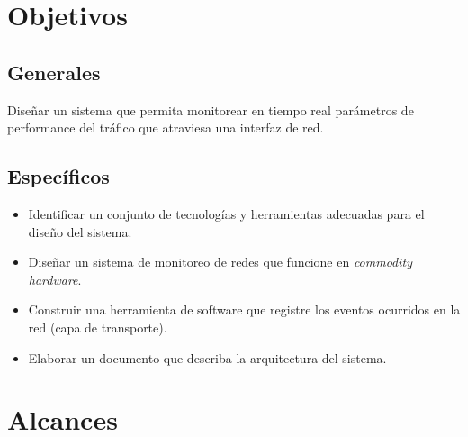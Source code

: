 \section*{Objetivos}
\subsection*{Generales}
Diseñar un sistema que permita monitorear en tiempo real parámetros de performance del tráfico que atraviesa una interfaz de red.
\subsection*{Específicos}
\begin{itemize}

\item Identificar un conjunto de tecnologías y herramientas adecuadas para el diseño del sistema.
\item Diseñar un sistema de monitoreo de redes que funcione en \textit{commodity hardware}.
\item Construir una herramienta de software que registre los eventos ocurridos en la red (capa de transporte).
\item Elaborar un documento que describa la arquitectura del sistema.
\end{itemize}

\section*{Alcances}

